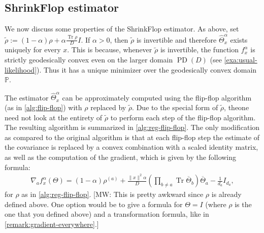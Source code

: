 \documentclass[aos]{imsart}
\theoremstyle{definition}
\numberwithin{equation}{section}
\DeclareMathOperator{\tr}{Tr}
\DeclareMathOperator{\PD}{PD}
\renewcommand{\P}{{\mathbb{P}}}
\newcommand{\otheta}{\overline{\Theta}}
\newcommand{\samp}{x}
\newcommand{\MW}[1]{{\color{red}[MW: #1]}}
\newcommand{\MW}[1]{{}}
\begin{document}
\subsection{ShrinkFlop estimator}
We now discuss some properties of the ShrinkFlop estimator. As above, set $\tilde{\rho} := (1- \alpha) \rho + \alpha \frac{\tr \rho}{D} I.$ If $\alpha > 0$, then $\tilde{\rho}$ is invertible and therefore $\widehat{\Theta}^\alpha_x$ exists uniquely for every $x$.
This is because, whenever $\tilde{\rho}$ is invertible, the function $f_{\samp}^\alpha$ is strictly geodesically convex even on the larger domain $\PD(D)$ (see \cref{exa:usual-likelihood}). Thus it has a unique minimizer over the geodesically convex domain $\P$.

The estimator $\widehat{\Theta}^\alpha_x$ can be approximately computed using the flip-flop algorithm (as in \cref{alg:flip-flop}) with $\rho$ replaced by $\tilde{\rho}$.
Due to the special form of $\tilde{\rho}$, theone need not look at the entirety of $\tilde{\rho}$ to perform each step of the flip-flop algorithm.
The resulting algorithm is summarized in \cref{alg:reg-flip-flop}.
The only modification as compared to the original algorithm is that at each flip-flop step the estimate of the covariance is replaced by a convex combination with a scaled identity matrix, as well as the computation of the gradient, which is given by the following formula:
\begin{align}\nabla_a f^\alpha_\samp(\Theta) = (1 - \alpha) \rho^{(a)} + \frac{\|x\|^2 \alpha}{D}  (\prod_{b \neq a} \tr \otheta_b ) \otheta_a - \frac{1}{d_a} I_{d_a}, \label{eq:reg-like}
\end{align}
for $\rho$ as in \cref{alg:reg-flip-flop}.
\MW{This is pretty awkward since $\rho$ is already defined above. One option would be to give a formula for $\Theta=I$ (where $\rho$ is the one that you defined above) and a transformation formula, like in \cref{remark:gradient-everywhere}.}
\end{document}
